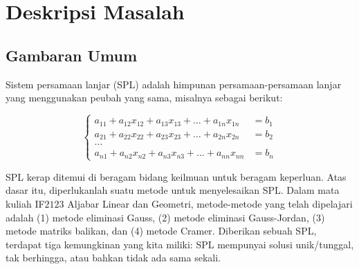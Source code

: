 \section{Deskripsi Masalah}
\subsection{Gambaran Umum}
Sistem persamaan lanjar (SPL) adalah himpunan persamaan-persamaan lanjar yang menggunakan peubah yang sama, misalnya sebagai berikut:

\[\begin{cases}
    a_{11} + a_{12}x_{12} + a_{13}x_{13} + \ldots + a_{1n}x_{1n} &= b_1 \\ 
    a_{21} + a_{22}x_{22} + a_{23}x_{23} + \ldots + a_{2n}x_{2n} &= b_2 \\
    \ldots \\
    a_{n1} + a_{n2}x_{n2} + a_{n3}x_{n3} + \ldots + a_{nn}x_{nn} &= b_n
\end{cases}\]

SPL kerap ditemui di beragam bidang keilmuan untuk beragam keperluan. Atas dasar itu, diperlukanlah suatu metode untuk menyelesaikan SPL. Dalam mata kuliah IF$2123$ Aljabar Linear dan Geometri, metode-metode yang telah dipelajari adalah (1) metode eliminasi Gauss, (2) metode eliminasi Gauss-Jordan, (3) metode matriks balikan, dan (4) metode Cramer. Diberikan sebuah SPL, terdapat tiga kemungkinan yang kita miliki: SPL mempunyai solusi unik/tunggal, tak berhingga, atau bahkan tidak ada sama sekali.

